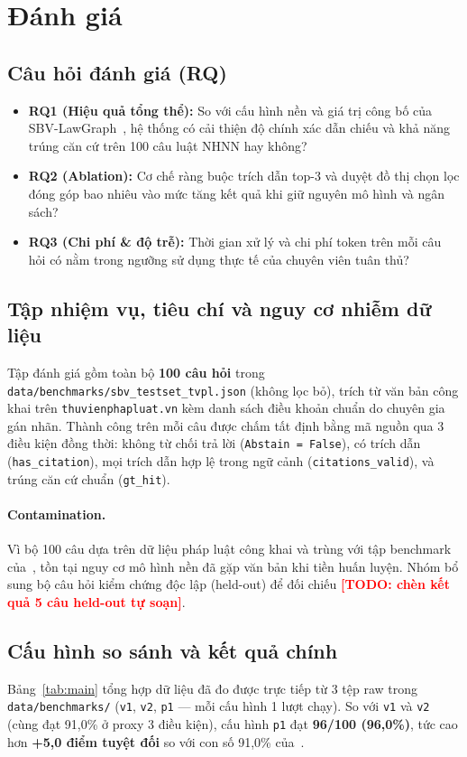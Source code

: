 \documentclass[sigconf,nonacm]{acmart}
\newcommand{\TODO}[1]{\textcolor{red}{\textbf{[TODO: #1]}}}
\begin{document}
\section{Đánh giá}
\label{sec:eval}

\subsection{Câu hỏi đánh giá (RQ)}
\begin{itemize}[leftmargin=*]
  \item \textbf{RQ1 (Hiệu quả tổng thể):} So với cấu hình nền và giá trị công bố của SBV-LawGraph~\cite{phan2026sbv}, hệ thống có cải thiện độ chính xác dẫn chiếu và khả năng trúng căn cứ trên 100 câu luật NHNN hay không?
  \item \textbf{RQ2 (Ablation):} Cơ chế ràng buộc trích dẫn top-3 và duyệt đồ thị chọn lọc đóng góp bao nhiêu vào mức tăng kết quả khi giữ nguyên mô hình và ngân sách?
  \item \textbf{RQ3 (Chi phí \& độ trễ):} Thời gian xử lý và chi phí token trên mỗi câu hỏi có nằm trong ngưỡng sử dụng thực tế của chuyên viên tuân thủ?
\end{itemize}

\subsection{Tập nhiệm vụ, tiêu chí và nguy cơ nhiễm dữ liệu}
Tập đánh giá gồm toàn bộ \textbf{100 câu hỏi} trong \texttt{data/benchmarks/sbv\_testset\_tvpl.json} (không lọc bỏ), trích từ văn bản công khai trên \texttt{thuvienphapluat.vn} kèm danh sách điều khoản chuẩn do chuyên gia gán nhãn. Thành công trên mỗi câu được chấm tất định bằng mã nguồn qua 3 điều kiện đồng thời: không từ chối trả lời (\texttt{Abstain = False}), có trích dẫn (\texttt{has\_citation}), mọi trích dẫn hợp lệ trong ngữ cảnh (\texttt{citations\_valid}), và trúng căn cứ chuẩn (\texttt{gt\_hit}).
\paragraph{Contamination.} Vì bộ 100 câu dựa trên dữ liệu pháp luật công khai và trùng với tập benchmark của~\cite{phan2026sbv}, tồn tại nguy cơ mô hình nền đã gặp văn bản khi tiền huấn luyện. Nhóm bổ sung bộ câu hỏi kiểm chứng độc lập (held-out) để đối chiếu \TODO{chèn kết quả 5 câu held-out tự soạn}.

\subsection{Cấu hình so sánh và kết quả chính}
Bảng~\ref{tab:main} tổng hợp dữ liệu đã đo được trực tiếp từ 3 tệp raw trong \texttt{data/benchmarks/} (\texttt{v1}, \texttt{v2}, \texttt{p1} — mỗi cấu hình 1 lượt chạy). So với \texttt{v1} và \texttt{v2} (cùng đạt 91,0\% ở proxy 3 điều kiện), cấu hình \texttt{p1} đạt \textbf{96/100 (96,0\%)}, tức cao hơn \textbf{+5,0 điểm tuyệt đối} so với con số 91,0\% của~\cite{phan2026sbv}.
\end{document}
